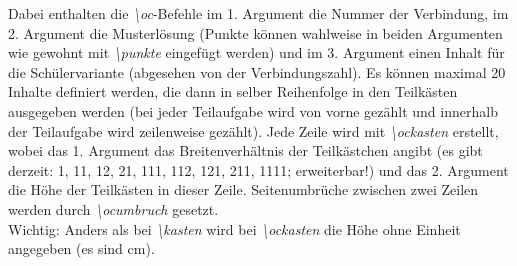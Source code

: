 \documentclass[./main.tex]{subfiles}
\begin{document}
\begin{itemize}
    Dabei enthalten die \textit{\textbackslash oc}-Befehle im 1. Argument die Nummer der Verbindung, im 2. Argument die Musterl\"osung (Punkte k\"onnen wahlweise in beiden Argumenten wie gewohnt mit \textit{\textbackslash punkte} eingef\"ugt werden) und im 3. Argument einen Inhalt f\"ur die Sch\"ulervariante (abgesehen von der Verbindungszahl). Es k\"onnen maximal 20 Inhalte definiert werden, die dann in selber Reihenfolge in den Teilk\"asten ausgegeben werden (bei jeder Teilaufgabe wird von vorne gez\"ahlt und innerhalb der Teilaufgabe wird zeilenweise gez\"ahlt). Jede Zeile wird mit \textit{\textbackslash ockasten} erstellt, wobei das 1. Argument das Breitenverh\"altnis der Teilk\"astchen angibt (es gibt derzeit: 1, 11, 12, 21, 111, 112, 121, 211, 1111; erweiterbar!) und das 2. Argument die H\"ohe der Teilk\"asten in dieser Zeile. Seitenumbr\"uche zwischen zwei Zeilen werden durch \textit{\hypertarget{ocumbruch}{\textbackslash ocumbruch}} gesetzt. \\Wichtig: Anders als bei \textit{\textbackslash kasten} wird bei \textit{\textbackslash ockasten} die H\"ohe ohne Einheit angegeben (es sind cm).
\end{itemize}
\end{document}
